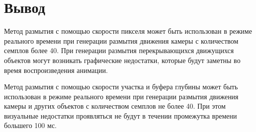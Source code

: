 \section{Вывод}


Метод размытия с помощью скорости пикселя может быть использован в режиме реального времени при генерации размытия движения камеры с количеством семплов более 40. При генерации размытия перекрывающихся движущихся объектов могут возникать графические недостатки, которые будут заметны во время воспроизведения анимации. 


Метод размытия с помощью скорости участка и буфера глубины  может быть использован в режиме реального времени при генерации размытия движения камеры и других объектов с количеством семплов не более 40. При этом визуальные недостатки проявляться не будут в течении промежутка времени большего 100 мс.








